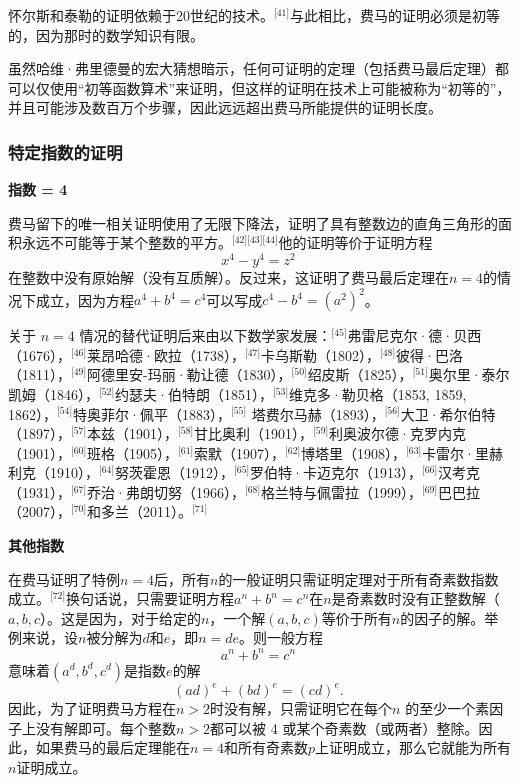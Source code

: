 怀尔斯和泰勒的证明依赖于20世纪的技术。\(^\text{[41]}\)与此相比，费马的证明必须是初等的，因为那时的数学知识有限。

虽然哈维·弗里德曼的宏大猜想暗示，任何可证明的定理（包括费马最后定理）都可以仅使用“初等函数算术”来证明，但这样的证明在技术上可能被称为“初等的”，并且可能涉及数百万个步骤，因此远远超出费马所能提供的证明长度。
\subsubsection{特定指数的证明}
\textbf{指数 = 4}  

费马留下的唯一相关证明使用了无限下降法，证明了具有整数边的直角三角形的面积永远不可能等于某个整数的平方。\(^\text{[42][43][44]}\)他的证明等价于证明方程
\[
x^4 - y^4 = z^2~
\]
在整数中没有原始解（没有互质解）。反过来，这证明了费马最后定理在\( n = 4 \)的情况下成立，因为方程\( a^4 + b^4 = c^4 \)可以写成\( c^4 - b^4 = (a^2)^2 \)。

关于 \( n = 4 \) 情况的替代证明后来由以下数学家发展：\(^\text{[45]}\)弗雷尼克尔·德·贝西（1676），\(^\text{[46]}\)莱昂哈德·欧拉（1738），\(^\text{[47]}\)卡乌斯勒（1802），\(^\text{[48]}\)彼得·巴洛（1811），\(^\text{[49]}\)阿德里安-玛丽·勒让德（1830），\(^\text{[50]}\)绍皮斯（1825），\(^\text{[51]}\)奥尔里·泰尔凯姆（1846），\(^\text{[52]}\)约瑟夫·伯特朗（1851），\(^\text{[53]}\)维克多·勒贝格（1853, 1859, 1862），\(^\text{[54]}\)特奥菲尔·佩平（1883），\(^\text{[55]}\) 塔费尔马赫（1893），\(^\text{[56]}\)大卫·希尔伯特（1897），\(^\text{[57]}\)本兹（1901），\(^\text{[58]}\)甘比奥利（1901），\(^\text{[59]}\)利奥波尔德·克罗内克（1901），\(^\text{[60]}\)班格（1905），\(^\text{[61]}\)索默（1907），\(^\text{[62]}\)博塔里（1908），\(^\text{[63]}\)卡雷尔·里赫利克（1910），\(^\text{[64]}\)努茨霍恩（1912），\(^\text{[65]}\)罗伯特·卡迈克尔（1913），\(^\text{[66]}\)汉考克（1931），\(^\text{[67]}\)乔治·弗朗切努（1966），\(^\text{[68]}\)格兰特与佩雷拉（1999），\(^\text{[69]}\)巴巴拉（2007），\(^\text{[70]}\)和多兰（2011）。\(^\text{[71]}\)

\textbf{其他指数}  

在费马证明了特例\( n = 4 \)后，所有\( n \)的一般证明只需证明定理对于所有奇素数指数成立。\(^\text{[72]}\)换句话说，只需要证明方程\( a^n + b^n = c^n \)在\( n \)是奇素数时没有正整数解（\( a, b, c \)）。这是因为，对于给定的\( n \)，一个解\( (a, b, c)\)等价于所有\( n \)的因子的解。举例来说，设\( n \)被分解为\( d \)和\( e \)，即\( n = de \)。则一般方程
\[
a^n + b^n = c^n~
\]
意味着\( (a^d, b^d, c^d) \)是指数\( e \)的解
\[
(ad)^e + (bd)^e = (cd)^e.~
\]
因此，为了证明费马方程在\( n > 2 \)时没有解，只需证明它在每个\( n \) 的至少一个素因子上没有解即可。每个整数\( n > 2 \)都可以被 4 或某个奇素数（或两者）整除。因此，如果费马的最后定理能在\( n = 4 \)和所有奇素数\( p \)上证明成立，那么它就能为所有\( n \)证明成立。